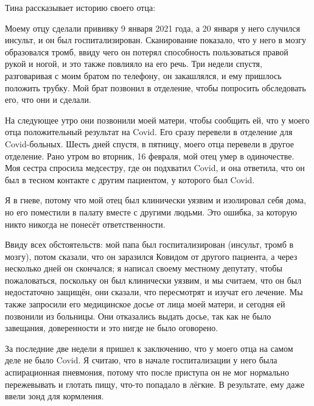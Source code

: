 Тина рассказывает историю своего отца:

Моему отцу сделали прививку 9 января 2021 года, а 20 января у него случился
инсульт, и он был госпитализирован. Сканирование показало, что у него в мозгу
образовался тромб, ввиду чего он потерял способность пользоваться правой рукой и
ногой, и это также повлияло на его речь. Три недели спустя, разговаривая с моим
братом по телефону, он закашлялся, и ему пришлось положить трубку. Мой брат
позвонил в отделение, чтобы попросить обследовать его, что они и сделали.

На следующее утро они позвонили моей матери, чтобы сообщить ей, что у моего отца
положительный результат на Covid. Его сразу перевели в отделение для
Covid-больных. Шесть дней спустя, в пятницу, моего отца перевели в другое
отделение. Рано утром во вторник, 16 февраля, мой отец умер в одиночестве. Моя
сестра спросила медсестру, где он подхватил Covid, и она ответила, что он был в
тесном контакте с другим пациентом, у которого был Covid.

Я в гневе, потому что мой отец был клинически уязвим и изолировал себя дома, но
его поместили в палату вместе с другими людьми. Это ошибка, за которую никто
никогда не понесёт ответственности.

Ввиду всех обстоятельств: мой папа был госпитализирован (инсульт, тромб в
мозгу), потом сказали, что он заразился Ковидом от другого пациента, а через
несколько дней он скончался; я написал своему местному депутату, чтобы
пожаловаться, поскольку он был клинически уязвим, и мы считаем, что он был
недостаточно защищён, они сказали, что пересмотрят и изучат его лечение. Мы
также запросили его медицинское досье от лица моей матери, и сегодня ей
позвонили из больницы. Они отказались выдать досье, так как не было завещания,
доверенности и это нигде не было оговорено.

За последние две недели я пришел к заключению, что у моего отца на самом деле не
было Covid. Я считаю, что в начале госпитализации у него была аспирационная
пневмония, потому что после приступа он не мог нормально пережевывать и глотать
пищу, что-то попадало в лёгкие. В результате, ему даже ввели зонд для кормления.


